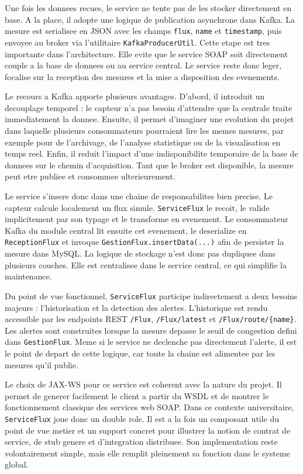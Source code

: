 \documentclass[12pt,a4paper]{report}
\begin{document}
Une fois les donnees recues, le service ne tente pas de les stocker directement en base. A la place, il adopte une logique de publication asynchrone dans Kafka. La mesure est serialisee en JSON avec les champs \texttt{flux}, \texttt{name} et \texttt{timestamp}, puis envoyee au broker via l'utilitaire \texttt{KafkaProducerUtil}. Cette etape est tres importante dans l'architecture. Elle evite que le service SOAP soit directement couple a la base de donnees ou au service central. Le service reste donc leger, focalise sur la reception des mesures et la mise a disposition des evenements.

Le recours a Kafka apporte plusieurs avantages. D'abord, il introduit un decouplage temporel : le capteur n'a pas besoin d'attendre que la centrale traite immediatement la donnee. Ensuite, il permet d'imaginer une evolution du projet dans laquelle plusieurs consommateurs pourraient lire les memes mesures, par exemple pour de l'archivage, de l'analyse statistique ou de la visualisation en temps reel. Enfin, il reduit l'impact d'une indisponibilite temporaire de la base de donnees sur le chemin d'acquisition. Tant que le broker est disponible, la mesure peut etre publiee et consommee ulterieurement.

Le service s'insere donc dans une chaine de responsabilites bien precise. Le capteur calcule localement un flux simule. \texttt{ServiceFlux} le recoit, le valide implicitement par son typage et le transforme en evenement. Le consommateur Kafka du module central lit ensuite cet evenement, le deserialize en \texttt{ReceptionFlux} et invoque \texttt{GestionFlux.insertData(...)} afin de persister la mesure dans MySQL. La logique de stockage n'est donc pas dupliquee dans plusieurs couches. Elle est centralisee dans le service central, ce qui simplifie la maintenance.

Du point de vue fonctionnel, \texttt{ServiceFlux} participe indirectement a deux besoins majeurs : l'historisation et la detection des alertes. L'historique est rendu accessible par les endpoints REST \texttt{/Flux}, \texttt{/Flux/latest} et \texttt{/Flux/route/\{name\}}. Les alertes sont construites lorsque la mesure depasse le seuil de congestion defini dans \texttt{GestionFlux}. Meme si le service ne declenche pas directement l'alerte, il est le point de depart de cette logique, car toute la chaine est alimentee par les mesures qu'il publie.

Le choix de JAX-WS pour ce service est coherent avec la nature du projet. Il permet de generer facilement le client a partir du WSDL et de montrer le fonctionnement classique des services web SOAP. Dans ce contexte universitaire, \texttt{ServiceFlux} joue donc un double role. Il est a la fois un composant utile du point de vue metier et un support concret pour illustrer la notion de contrat de service, de stub genere et d'integration distribuee. Son implementation reste volontairement simple, mais elle remplit pleinement sa fonction dans le systeme global.
\end{document}
